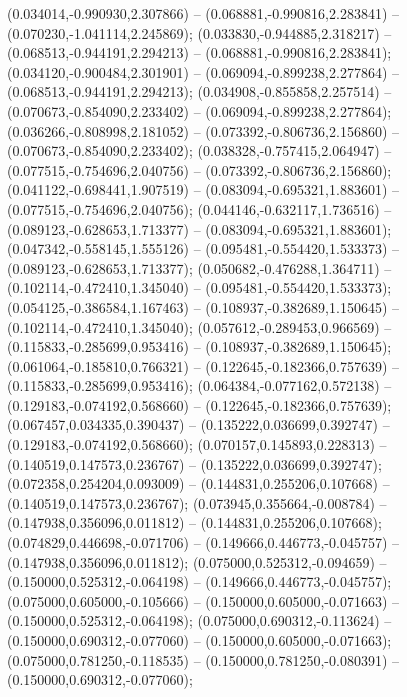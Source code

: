  (0.034014,-0.990930,2.307866) -- (0.068881,-0.990816,2.283841) -- (0.070230,-1.041114,2.245869);
 (0.033830,-0.944885,2.318217) -- (0.068513,-0.944191,2.294213) -- (0.068881,-0.990816,2.283841);
 (0.034120,-0.900484,2.301901) -- (0.069094,-0.899238,2.277864) -- (0.068513,-0.944191,2.294213);
 (0.034908,-0.855858,2.257514) -- (0.070673,-0.854090,2.233402) -- (0.069094,-0.899238,2.277864);
 (0.036266,-0.808998,2.181052) -- (0.073392,-0.806736,2.156860) -- (0.070673,-0.854090,2.233402);
 (0.038328,-0.757415,2.064947) -- (0.077515,-0.754696,2.040756) -- (0.073392,-0.806736,2.156860);
 (0.041122,-0.698441,1.907519) -- (0.083094,-0.695321,1.883601) -- (0.077515,-0.754696,2.040756);
 (0.044146,-0.632117,1.736516) -- (0.089123,-0.628653,1.713377) -- (0.083094,-0.695321,1.883601);
 (0.047342,-0.558145,1.555126) -- (0.095481,-0.554420,1.533373) -- (0.089123,-0.628653,1.713377);
 (0.050682,-0.476288,1.364711) -- (0.102114,-0.472410,1.345040) -- (0.095481,-0.554420,1.533373);
 (0.054125,-0.386584,1.167463) -- (0.108937,-0.382689,1.150645) -- (0.102114,-0.472410,1.345040);
 (0.057612,-0.289453,0.966569) -- (0.115833,-0.285699,0.953416) -- (0.108937,-0.382689,1.150645);
 (0.061064,-0.185810,0.766321) -- (0.122645,-0.182366,0.757639) -- (0.115833,-0.285699,0.953416);
 (0.064384,-0.077162,0.572138) -- (0.129183,-0.074192,0.568660) -- (0.122645,-0.182366,0.757639);
 (0.067457,0.034335,0.390437) -- (0.135222,0.036699,0.392747) -- (0.129183,-0.074192,0.568660);
 (0.070157,0.145893,0.228313) -- (0.140519,0.147573,0.236767) -- (0.135222,0.036699,0.392747);
 (0.072358,0.254204,0.093009) -- (0.144831,0.255206,0.107668) -- (0.140519,0.147573,0.236767);
 (0.073945,0.355664,-0.008784) -- (0.147938,0.356096,0.011812) -- (0.144831,0.255206,0.107668);
 (0.074829,0.446698,-0.071706) -- (0.149666,0.446773,-0.045757) -- (0.147938,0.356096,0.011812);
 (0.075000,0.525312,-0.094659) -- (0.150000,0.525312,-0.064198) -- (0.149666,0.446773,-0.045757);
 (0.075000,0.605000,-0.105666) -- (0.150000,0.605000,-0.071663) -- (0.150000,0.525312,-0.064198);
 (0.075000,0.690312,-0.113624) -- (0.150000,0.690312,-0.077060) -- (0.150000,0.605000,-0.071663);
 (0.075000,0.781250,-0.118535) -- (0.150000,0.781250,-0.080391) -- (0.150000,0.690312,-0.077060);
